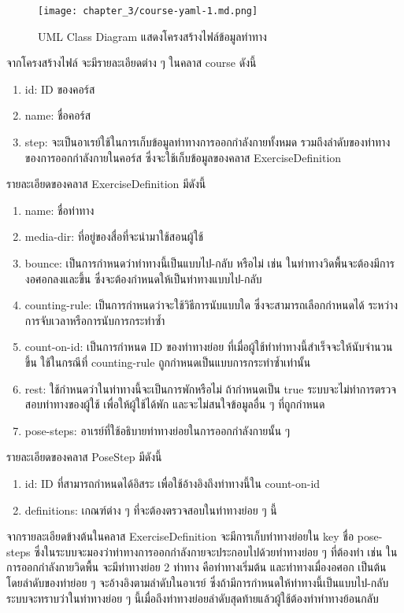 \begin{figure}
    \texttt{[image: chapter\_3/course-yaml-1.md.png]}
    \caption{UML Class Diagram แสดงโครงสร้างไฟล์ข้อมูลท่าทาง}
\end{figure}

จากโครงสร้างไฟล์ จะมีรายละเอียดต่าง ๆ ในคลาส course ดังนี้
\begin{enumerate}
    \item id: ID ของคอร์ส
    \item name: ชื่อคอร์ส
    \item step: จะเป็นอาเรย์ใช้ในการเก็บข้อมูลท่าทางการออกกำลังกายทั้งหมด รวมถึงลำดับของท่าทางของการออกกำลังกายในคอร์ส ซึ่งจะใช้เก็บข้อมูลของคลาส ExerciseDefinition
\end{enumerate}

รายละเอียดของคลาส ExerciseDefinition มีดังนี้
\begin{enumerate}
    \item name: ชื่อท่าทาง
    \item media-dir: ที่อยู่ของสื่อที่จะนำมาใช้สอนผู้ใช้
    \item bounce: เป็นการกำหนดว่าท่าทางนี้เป็นแบบไป-กลับ หรือไม่ เช่น ในท่าทางวิดพื้นจะต้องมีการงอศอกลงและขึ้น ซึ่งจะต้องกำหนดให้เป็นท่าทางแบบไป-กลับ
    \item counting-rule: เป็นการกำหนดว่าจะใช้วิธีการนับแบบใด ซึ่งจะสามารถเลือกกำหนดได้ ระหว่างการจับเวลาหรือการนับการกระทำซ้ำ
    \item count-on-id: เป็นการกำหนด ID ของท่าทางย่อย ที่เมื่อผู้ใช้ทำท่าทางนี้สำเร็จจะให้นับจำนวนขึ้น ใช้ในกรณีที่ counting-rule ถูกกำหนดเป็นแบบการกระทำซ้ำเท่านั้น
    \item rest: ใช้กำหนดว่าในท่าทางนี้จะเป็นการพักหรือไม่ ถ้ากำหนดเป็น true ระบบจะไม่ทำการตรวจสอบท่าทางของผู้ใช้ เพื่อให้ผู้ใช้ได้พัก และจะไม่สนใจข้อมูลอื่น ๆ ที่ถูกกำหนด
    \item pose-steps: อาเรย์ที่ใช้อธิบายท่าทางย่อยในการออกกำลังกายนั้น ๆ
\end{enumerate}

รายละเอียดของคลาส PoseStep มีดังนี้
\begin{enumerate}
    \item id: ID ที่สามารถกำหนดได้อิสระ เพื่อใช้อ้างอิงถึงท่าทางนี้ใน count-on-id
    \item definitions: เกณฑ์ต่าง ๆ ที่จะต้องตรวจสอบในท่าทางย่อย ๆ นี้
\end{enumerate}
จากรายละเอียดข้างต้นในคลาส ExerciseDefinition จะมีการเก็บท่าทางย่อยใน key ชื่อ pose-steps ซึ่งในระบบจะมองว่าท่าทางการออกกำลังกายจะประกอบไปด้วยท่าทางย่อย ๆ ที่ต้องทำ เช่น ในการออกกำลังกายวิดพื้น จะมีท่าทางย่อย 2 ท่าทาง คือท่าทางเริ่มต้น และท่าทางเมื่องอศอก เป็นต้น โดยลำดับของท่าย่อย ๆ จะอ้างอิงตามลำดับในอาเรย์ ซึ่งถ้ามีการกำหนดให้ท่าทางนี้เป็นแบบไป-กลับ ระบบจะทราบว่าในท่าทางย่อย ๆ นี้เมื่อถึงท่าทางย่อยลำดับสุดท้ายแล้วผู้ใช้ต้องทำท่าทางย้อนกลับ

